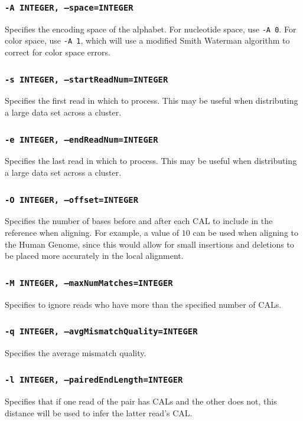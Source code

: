 \documentclass[a4paper,12pt]{book}
\newcommand{\TT}[1]{{\tt #1}} %
\begin{document}
\subsubsection{\TT{-A INTEGER, --space=INTEGER}}
Specifies the encoding space of the alphabet.
For nucleotide space, use \TT{-A 0}.
For color space, use \TT{-A 1}, which will use a modified Smith Waterman algorithm to correct for color space errors.

\subsubsection{\TT{-s INTEGER, --startReadNum=INTEGER}}
Specifies the first read in which to process.
This may be useful when distributing a large data set across a cluster.

\subsubsection{\TT{-e INTEGER, --endReadNum=INTEGER}}
Specifies the last read in which to process.
This may be useful when distributing a large data set across a cluster.

\subsubsection{\TT{-O INTEGER, --offset=INTEGER}}
Specifies the number of bases before and after each CAL to include in the reference when aligning.
For example, a value of $10$ can be used when aligning to the Human Genome, since this would allow for small insertions and deletions to be placed more accurately in the local alignment.

\subsubsection{\TT{-M INTEGER, --maxNumMatches=INTEGER}}
Specifies to ignore reads who have more than the specified number of CALs.


\subsubsection{\TT{-q INTEGER, --avgMismatchQuality=INTEGER}}
Specifies the average mismatch quality.

\subsubsection{\TT{-l INTEGER, --pairedEndLength=INTEGER}}
Specifies that if one read of the pair has CALs and the other does not, this distance will be used to infer the latter read’s CAL.
\end{document}
